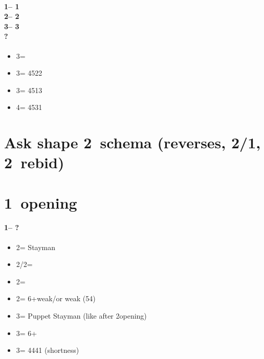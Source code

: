\documentclass[12pt, a4paper]{report}
\begin{document}
{{{            \subsubsection*{1\hearts -- 1\spades\\
                            2\spades -- 2\nt\\
                            3\clubs -- 3\diams\\
                            ?}
            \begin{itemize}
                \item 3\hearts = \bal
                \item 3\spades = 4522
                \item 3\nt = 4513
                \item 4\clubs = 4531
            \end{itemize}
        }

        \chapter*{\colorbox{Plum!30}{Ask shape 2\ntch\ schema}
                \colorbox{Plum!30}{(reverses, 2/1, 2\ntch\ rebid)}}
         {

        }

    }

    \chapter*{\colorbox{Plum!30}{1\ntch\ opening}}
     {
        \subsubsection*{1\nt -- ?}
        \begin{itemize}
            \item 2\clubs = Stayman
            \item 2\diams/2\hearts = \then \major
            \item 2\spades = \then \clubs
            \item 2\nt = 6+\diams weak/\gf or \minor weak (54)
            \item 3\clubs = Puppet Stayman (like after 2\nt opening) \imp
            \item 3\diams = 6+\diams\ \inv
            \item 3\major = 4441 (\major shortness) \gf \qq
        \end{itemize}

}}
\end{document}
